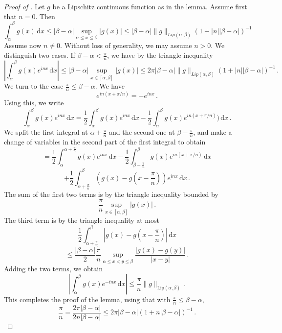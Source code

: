 \documentclass[10pt,a4paper]{article}
\theoremstyle{plain}
\theoremstyle{definition}
\numberwithin{equation}{subsection}
\newcommand{\proves}[1]{}
\newcommand{\leanok}{}
\begin{document}
\begin{proof}[Proof of ]
\proves{van-der-Corput}
\leanok
Let $g$ be a Lipschitz continuous function as in the lemma.
Assume first that $n=0$. Then
\begin{equation*}
    \int_\alpha^\beta g(x) \, \mathrm{d}x \le |\beta - \alpha| \sup_{\alpha\le x\le \beta}|g(x)|
    \le |\beta-\alpha|\|g\|_{Lip(\alpha,\beta)}(1+|n||\beta-\alpha|)^{-1}
\end{equation*}
Assume now $n\ne 0$. Without loss of generality, we may assume $n>0$.
We distinguish two cases. If $\beta-\alpha < \frac{\pi}{n}$, we have by the triangle inequality
\begin{equation*}
    \left|\int_\alpha^\beta g(x) e^{inx} \, \mathrm{d}x\right|
    \le |\beta -\alpha| \sup_{x \in [\alpha,\beta]} |g(x)|
    \le 2\pi |\beta-\alpha|\|g\|_{Lip(\alpha,\beta)}(1+|n||\beta-\alpha|)^{-1} \,.
\end{equation*}
We turn to the case $\frac{\pi}{n} \le \beta-\alpha$.
We have
$$
    e^{in(x + \pi/n)} = -e^{inx}\,.
$$
Using this, we write
$$
    \int_\alpha^\beta g(x) e^{inx} \, \mathrm{d}x
    = \frac{1}{2} \int_\alpha^\beta g(x) e^{inx} \, \mathrm{d}x - \frac{1}{2} \int_\alpha^\beta g(x) e^{in(x + \pi/n)}) \, \mathrm{d}x\,.
$$
We split the first integral at $\alpha + \frac{\pi}{n}$ and the second one at $\beta - \frac{\pi}{n}$, and make a change of variables in the second part of the first integral to obtain
$$
    = \frac{1}{2} \int_{\alpha}^{\alpha + \frac{\pi}{n}} g(x) e^{inx} \, \mathrm{d}x - \frac{1}{2} \int_{\beta - \frac{\pi}{n}}^{\beta} g(x) e^{in(x + \pi/n)} \, \mathrm{d}x
$$
$$
    + \frac{1}{2} \int_{\alpha + \frac{\pi}{n}}^{\beta} (g(x) - g(x - \frac{\pi}{n})) e^{inx} \, \mathrm{d}x\,.
$$
The sum of the first two terms is by the triangle inequality bounded by
$$
    \frac{\pi}{n} \sup_{x \in [\alpha,\beta]} |g(x)|\,.
$$
The third term is by the triangle inequality at most
$$
    \frac{1}{2} \int_{\alpha + \frac{\pi}{n}}^\beta |g(x) - g(x - \frac{\pi}{n})| \, \mathrm{d}x
$$
$$
    \le \frac{|\beta-\alpha|}{2} \frac{\pi}{n} \sup_{\alpha \le x < y \le \beta} \frac{|g(x) - g(y)|}{|x-y|}\,.
$$
Adding the two terms, we obtain
$$
    \left|\int_\alpha^\beta g(x) e^{-inx} \, \mathrm{d}x\right| \le \frac{\pi}{n} \|g\|_{\mathrm{Lip}(\alpha,\beta)}\,.
$$
This completes the proof of the lemma, using that with $\frac{\pi}{n} \le \beta-\alpha$,
$$
    \frac{\pi}{n} = \frac{2 \pi |\beta-\alpha|}{2n|\beta-\alpha|} \le 2 \pi |\beta-\alpha|(1 + n|\beta-\alpha|)^{-1}\,.
$$
\end{proof}
\end{document}
